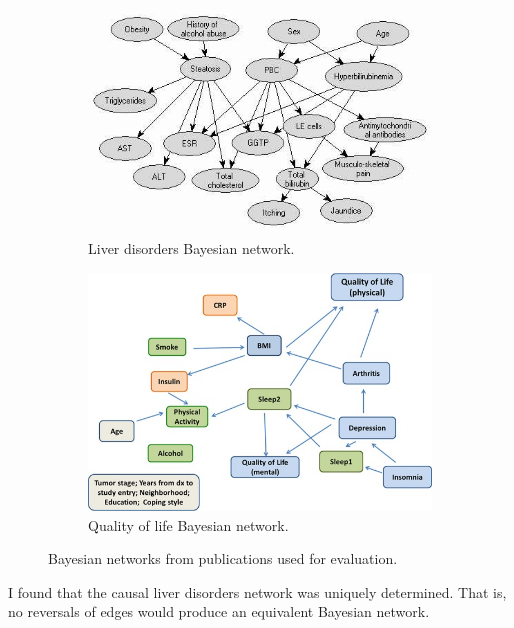 \documentclass{article}
\begin{document}
	\begin{figure}[t]
		\begin{subfigure}{\columnwidth}
			\includegraphics[width=\textwidth]{liver-disorders.png}
			\caption{Liver disorders Bayesian network\cite{liverDisorders}.}
		\end{subfigure}
		\begin{subfigure}{\columnwidth}
			\includegraphics[width=\textwidth]{qol.jpg}
			\caption{Quality of life Bayesian network\cite{barberBRML2012}.}
		\end{subfigure}
		\caption{Bayesian networks from publications used for evaluation.}
		\label{networks}
	\end{figure}
	
	I found that the causal liver disorders network was uniquely determined.
	That is, no reversals of edges would produce an equivalent Bayesian network.
	
\end{document}
